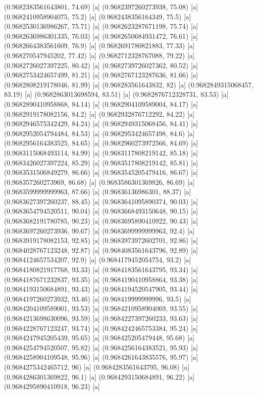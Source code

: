 {{{(0.9682383561643801, 74.69) [a] 
(0.9682397260273938, 75.08) [a] 
(0.9682410958904075, 75.2) [a] 
(0.9682438356164349, 75.5) [a] 
(0.9682530136986267, 75.71) [a] 
(0.9682623287671198, 75.74) [a] 
(0.9682636986301335, 76.03) [a] 
(0.9682650684931472, 76.61) [a] 
(0.9682664383561609, 76.9) [a] 
(0.9682691780821883, 77.33) [a] 
(0.968270547945202, 77.42) [a] 
(0.9682712328767088, 79.22) [a] 
(0.9682726027397225, 80.42) [a] 
(0.9682739726027362, 80.52) [a] 
(0.9682753424657499, 81.21) [a] 
(0.9682767123287636, 81.66) [a] 
(0.9682808219178046, 81.99) [a] 
(0.968283561643832, 82) [a] 
(0.9682849315068457, 83.19) [a] 
(0.9682863013698594, 83.51) [a] 
(0.9682876712328731, 83.53) [a] 
(0.9682890410958868, 84.14) [a] 
(0.9682904109589004, 84.17) [a] 
(0.9682919178082156, 84.2) [a] 
(0.9682932876712292, 84.22) [a] 
(0.9682946575342429, 84.24) [a] 
(0.9682949315068456, 84.41) [a] 
(0.9682952054794484, 84.53) [a] 
(0.9682953424657498, 84.6) [a] 
(0.9682956164383525, 84.65) [a] 
(0.9682960273972566, 84.69) [a] 
(0.9683115068493114, 84.99) [a] 
(0.9683117808219142, 85.18) [a] 
(0.9683426027397224, 85.29) [a] 
(0.9683517808219142, 85.81) [a] 
(0.9683531506849279, 86.66) [a] 
(0.9683545205479416, 86.67) [a] 
(0.968357260273969, 86.68) [a] 
(0.9683586301369826, 86.69) [a] 
(0.9683599999999963, 87.66) [a] 
(0.96836136986301, 88.37) [a] 
(0.9683627397260237, 88.45) [a] 
(0.9683641095890374, 90.03) [a] 
(0.9683654794520511, 90.04) [a] 
(0.9683668493150648, 90.15) [a] 
(0.9683682191780785, 90.23) [a] 
(0.9683695890410922, 90.43) [a] 
(0.9683697260273936, 90.67) [a] 
(0.9683699999999963, 92.4) [a] 
(0.9683919178082153, 92.85) [a] 
(0.9683973972602701, 92.86) [a] 
(0.9684028767123248, 92.87) [a] 
(0.9684083561643796, 92.89) [a] 
(0.9684124657534207, 92.9) [a] 
(0.9684179452054754, 93.2) [a] 
(0.9684180821917768, 93.33) [a] 
(0.9684183561643795, 93.34) [a] 
(0.9684187671232837, 93.35) [a] 
(0.9684190410958864, 93.38) [a] 
(0.9684193150684891, 93.43) [a] 
(0.9684194520547905, 93.44) [a] 
(0.9684197260273932, 93.46) [a] 
(0.968419999999996, 93.5) [a] 
(0.9684204109589001, 93.53) [a] 
(0.9684210958904069, 93.55) [a] 
(0.9684213698630096, 93.59) [a] 
(0.9684227397260233, 93.63) [a] 
(0.9684228767123247, 93.74) [a] 
(0.9684242465753384, 95.24) [a] 
(0.9684247945205439, 95.65) [a] 
(0.968425205479448, 95.68) [a] 
(0.9684254794520507, 95.82) [a] 
(0.9684256164383521, 95.93) [a] 
(0.9684258904109548, 95.96) [a] 
(0.9684261643835576, 95.97) [a] 
(0.9684275342465712, 96) [a] 
(0.9684283561643795, 96.08) [a] 
(0.9684286301369822, 96.1) [a] 
(0.9684293150684891, 96.22) [a] 
(0.9684295890410918, 96.23) [a] 
}}}
